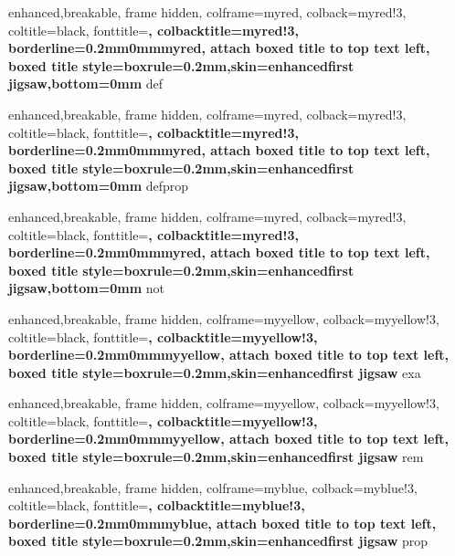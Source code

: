\newcommand{\exe}{\inlinebox[myred]{exercise}}
\newcommand{\exes}{\inlinebox[myred]{exercises}}

\newcommand*{\todo}[1][]{\inlinebox[mypurple]{\textbf{TODO} #1}}
\newcommand*{\source}[1][]{\inlinebox[myblue]{\textbf{SOURCE} #1}}
\newcommand*{\newresult}[1][]{\inlinebox[myyellow]{\textbf{NEW RESULT} #1}}
\newcommand*{\mynote}[1][]{\inlinebox[mygreen]{\textbf{NOTE} #1}}

{
	enhanced,breakable,
	frame hidden,
	colframe=myred,
	colback=myred!3,
	coltitle=black,
	fonttitle=\bfseries,
	colbacktitle=myred!3,
	borderline={0.2mm}{0mm}{myred},
	attach boxed title to top text left,
	boxed title style={boxrule=0.2mm,skin=enhancedfirst jigsaw,bottom=0mm}
}
{def}

{
	enhanced,breakable,
	frame hidden,
	colframe=myred,
	colback=myred!3,
	coltitle=black,
	fonttitle=\bfseries,
	colbacktitle=myred!3,
	borderline={0.2mm}{0mm}{myred},
	attach boxed title to top text left,
	boxed title style={boxrule=0.2mm,skin=enhancedfirst jigsaw,bottom=0mm}
}
{defprop}

{
	enhanced,breakable,
	frame hidden,
	colframe=myred,
	colback=myred!3,
	coltitle=black,
	fonttitle=\bfseries,
	colbacktitle=myred!3,
	borderline={0.2mm}{0mm}{myred},
	attach boxed title to top text left,
	boxed title style={boxrule=0.2mm,skin=enhancedfirst jigsaw,bottom=0mm}
}
{not}

{
	enhanced,breakable,
	frame hidden,
	colframe=myyellow,
	colback=myyellow!3,
	coltitle=black,
	fonttitle=\bfseries,
	colbacktitle=myyellow!3,
	borderline={0.2mm}{0mm}{myyellow},
	attach boxed title to top text left,
	boxed title style={boxrule=0.2mm,skin=enhancedfirst jigsaw}
}
{exa}


{
	enhanced,breakable,
	frame hidden,
	colframe=myyellow,
	colback=myyellow!3,
	coltitle=black,
	fonttitle=\bfseries,
	colbacktitle=myyellow!3,
	borderline={0.2mm}{0mm}{myyellow},
	attach boxed title to top text left,
	boxed title style={boxrule=0.2mm,skin=enhancedfirst jigsaw}
}
{rem}

{
	enhanced,breakable,
	frame hidden,
	colframe=myblue,
	colback=myblue!3,
	coltitle=black,
	fonttitle=\bfseries,
	colbacktitle=myblue!3,
	borderline={0.2mm}{0mm}{myblue},
	attach boxed title to top text left,
	boxed title style={boxrule=0.2mm,skin=enhancedfirst jigsaw}
}
{prop}

